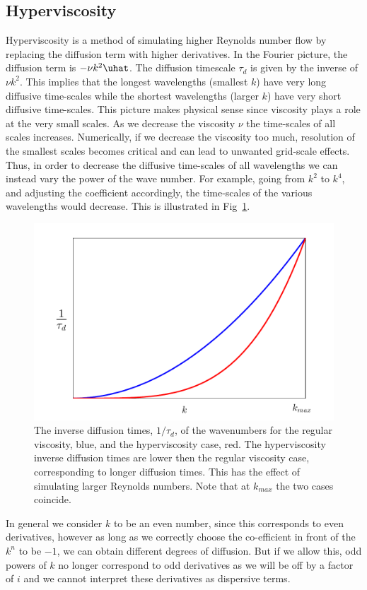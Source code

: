 \subsection{Hyperviscosity}
Hyperviscosity is a method of simulating higher Reynolds number flow by replacing the diffusion term with higher derivatives. In the Fourier picture, the diffusion term is $-\nu k^{2}\uhat$. The diffusion timescale $\tau_{d}$ is given by the inverse of $\nu k^{2}$. This implies that the longest wavelengths (smallest $k$) have very long diffusive time-scales while the shortest wavelengths (larger $k$) have very short diffusive time-scales. This picture makes physical sense since viscosity plays a role at the very small scales. As we decrease the viscosity $\nu$ the time-scales of all scales increases. Numerically, if we decrease the viscosity too much, resolution of the smallest scales becomes critical and can lead to unwanted grid-scale effects. Thus, in order to decrease the diffusive time-scales of all wavelengths we can instead vary the power of the wave number. For example, going from $k^{2}$ to $k^{4}$, and adjusting the coefficient accordingly, the time-scales of the various wavelengths would decrease. This is illustrated in Fig~\ref{hyper_vis_example}.

\begin{figure}
\begin{center}
\includegraphics[width=\textwidth]{hyper_vis_example.pdf}
\caption{The inverse diffusion times, $1/\tau_{d}$, of the wavenumbers for the regular viscosity, blue, and the hyperviscosity case, red. The hyperviscosity inverse diffusion times are lower then the regular viscosity case, corresponding to longer diffusion times. This has the effect of simulating larger Reynolds numbers. Note that at $k_{max}$ the two cases coincide.}
\label{hyper_vis_example}
\end{center}
\end{figure}
In general we consider $k$ to be an even number, since this corresponds to even derivatives, however as long as we correctly choose the co-efficient in front of the $k^{n}$ to be $-1$, we can obtain different degrees of diffusion. But if we allow this, odd powers of $k$ no longer correspond to odd derivatives as we will be off by a factor of $i$ and we cannot interpret these derivatives as dispersive terms.

